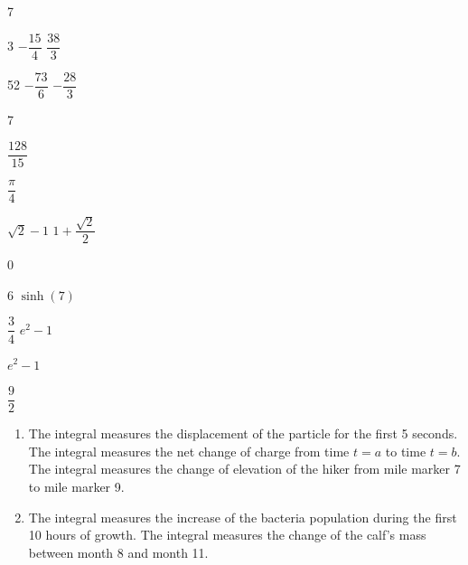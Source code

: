 \documentclass{book}
\begin{document}
\begin{appendices}
\begin{enumerate}[!HW!]
\begin{multicols}{7}
\item 3
\itemspade $-\dfrac{15}{4}$
\itemspade $\dfrac{38}{3}$
\item 52
\itemspade $-\dfrac{73}{6}$
\itemspade $-\dfrac{28}{3}$
\end{multicols}
\begin{multicols}{7}
\item $\dfrac{128}{15}$
\item $\dfrac{\pi}{4}$
\item $\sqrt{2}-1$
\itemspade $1+\dfrac{\sqrt{2}}{2}$
\item 0
\end{multicols}
\begin{multicols}{6}
\itemspade $\sinh(7)$
\item $\dfrac{3}{4}$
\itemspade $e^2-1$
\item $e^2-1$
\item $\dfrac{9}{2}$
\end{multicols}
\end{enumerate}
\vspace{-15pt}

\rebootHW

\begin{enumerate}[!HW!]
\item The integral measures the displacement of the particle for the first 5 seconds.
\itemspade The integral measures the net change of charge from time $t=a$ to time $t=b$.
\itemspade The integral measures the change of elevation of the hiker from mile marker 7 to mile marker 9.
\item The integral measures the increase of the bacteria population during the first 10 hours of growth.
\itemspade The integral measures the change of the calf's mass between month 8 and month 11.
\end{enumerate}\vspace{-15pt}


\end{appendices}
\end{document}
